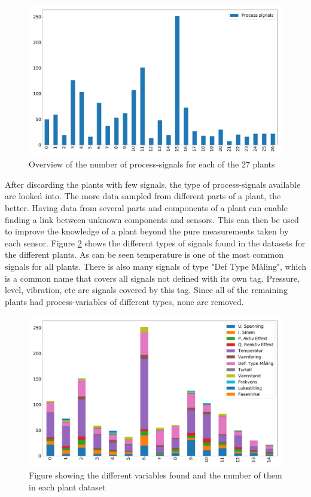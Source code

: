         \begin{figure}[h]
            \centering
            \includegraphics[width=\textwidth]{report/figures/data/plant_process_signals_overview.pdf}
            \caption{Overview of the number of process-signals for each of the 27 plants}
            \label{fig:process_signal_overview}
        \end{figure}
        
        After discarding the plants with few signals, the type of process-signals available are looked into. The more data sampled from different parts of a plant, the better. Having data from several parts and components of a plant can enable finding a link between unknown components and sensors. This can then be used to improve the knowledge of a plant beyond the pure measurements taken by each sensor. Figure \ref{fig:signal_type_overview} shows the different types of signals found in the datasets for the different plants. As can be seen temperature is one of the most common signals for all plants. There is also many signals of type "Def Type Måling", which is a common name that covers all signals not defined with its own tag. Pressure, level, vibration, etc are signals covered by this tag. Since all of the remaining plants had process-variables of different types, none are removed. 
        
        \begin{figure}
            \centering
            \includegraphics[width=\textwidth]{report/figures/data/plant_signal_types_overview.pdf}
            \caption{Figure showing the different variables found and the number of them in each plant dataset}
            \label{fig:signal_type_overview}
        \end{figure}
        
